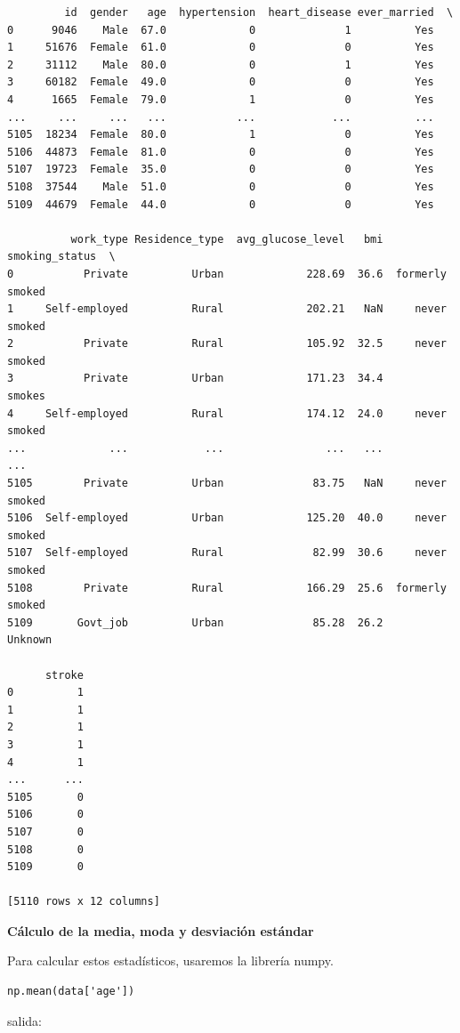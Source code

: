 \documentclass[letter]{article}
\begin{document}
\begin{verbatim}
         id  gender   age  hypertension  heart_disease ever_married  \
0      9046    Male  67.0             0              1          Yes
1     51676  Female  61.0             0              0          Yes
2     31112    Male  80.0             0              1          Yes
3     60182  Female  49.0             0              0          Yes
4      1665  Female  79.0             1              0          Yes
...     ...     ...   ...           ...            ...          ...
5105  18234  Female  80.0             1              0          Yes
5106  44873  Female  81.0             0              0          Yes
5107  19723  Female  35.0             0              0          Yes
5108  37544    Male  51.0             0              0          Yes
5109  44679  Female  44.0             0              0          Yes

          work_type Residence_type  avg_glucose_level   bmi   smoking_status  \
0           Private          Urban             228.69  36.6  formerly smoked
1     Self-employed          Rural             202.21   NaN     never smoked
2           Private          Rural             105.92  32.5     never smoked
3           Private          Urban             171.23  34.4           smokes
4     Self-employed          Rural             174.12  24.0     never smoked
...             ...            ...                ...   ...              ...
5105        Private          Urban              83.75   NaN     never smoked
5106  Self-employed          Urban             125.20  40.0     never smoked
5107  Self-employed          Rural              82.99  30.6     never smoked
5108        Private          Rural             166.29  25.6  formerly smoked
5109       Govt_job          Urban              85.28  26.2          Unknown

      stroke
0          1
1          1
2          1
3          1
4          1
...      ...
5105       0
5106       0
5107       0
5108       0
5109       0

[5110 rows x 12 columns]
\end{verbatim}

\textbf{Cálculo de la media, moda y desviación estándar}

Para calcular estos estadísticos, usaremos la librería numpy.

\begin{verbatim}
np.mean(data['age'])
\end{verbatim}

salida:
\end{document}
